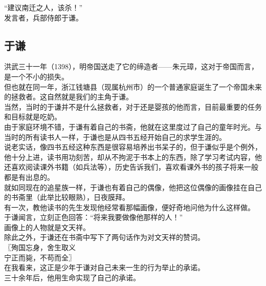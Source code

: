 \begin{multicols}{\theparacolNo}
“建议南迁之人，该杀！”\\

发言者，兵部侍郎于谦。\\

\subsection{于谦}
洪武三十一年（1398），明帝国送走了它的缔造者——朱元璋，这对于帝国而言，是一个不小的损失。\\

但也就在同一年，浙江钱塘县（现属杭州市）的一个普通家庭诞生了一个帝国未来的拯救者。这自然就是我们的主角于谦。\\

当然，当时的于谦并不是什么拯救者，对于还是婴孩的他而言，目前最重要的任务和目标就是吃奶。\\

由于家庭环境不错，于谦有着自己的书斋，他就在这里度过了自己的童年时光。与当时的所有读书人一样，于谦也是从四书五经开始自己的求学生涯的。\\

说老实话，像四书五经这种东西是很容易培养出书呆子的，但于谦似乎是个例外，他十分上进，读书用功刻苦，却从不拘泥于书本上的东西，除了学习考试内容，他还喜欢阅读课外书籍（如兵法等），历史告诉我们，喜欢看课外书的孩子将来一般都是有出息的。\\

就如同现在的追星族一样，于谦也有着自己的偶像，他把这位偶像的画像挂在自己的书斋里（此举比较眼熟），日夜膜拜。\\

有一次，教他读书的先生发现他经常看那幅画像，便好奇地问他为什么这样做。\\

于谦闻言，立刻正色回答：“将来我要做像他那样的人！”\\

画像上的人物就是文天祥。\\

除此之外，于谦还在书斋中写下了两句话作为对文天祥的赞词。\\

〖殉国忘身，舍生取义\\

宁正而毙，不苟而全〗\\

在我看来，这正是少年于谦对自己未来一生的行为举止的承诺。\\

三十余年后，他用生命实现了自己的承诺。\\


\end{multicols}
